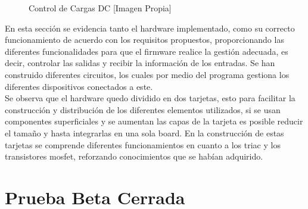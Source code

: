 \begin{figure}[H]
	\centering
	\caption{Control de Cargas DC [Imagen Propia]}
	\label{fig:DCc}
\end{figure}

En esta sección se evidencia tanto el hardware implementado, como su correcto funcionamiento de acuerdo con los requisitos propuestos, proporcionando las diferentes funcionalidades para que el firmware realice la gestión adecuada, es decir, controlar las salidas y recibir la información de los entradas. Se han construido diferentes circuitos, los cuales por medio del programa gestiona los diferentes dispositivos conectados a este.\\

Se observa que el hardware quedo dividido en dos tarjetas, esto para facilitar la construcción y distribución de los diferentes elementos utilizados, si se usan componentes superficiales y se aumentan las capas de la tarjeta es posible reducir el tamaño y hasta integrarlas en una sola board. En la construcción de estas tarjetas se comprende diferentes funcionamientos en cuanto a los triac y los transistores mosfet, reforzando conocimientos que se habían adquirido.\\

\section{Prueba Beta Cerrada}

